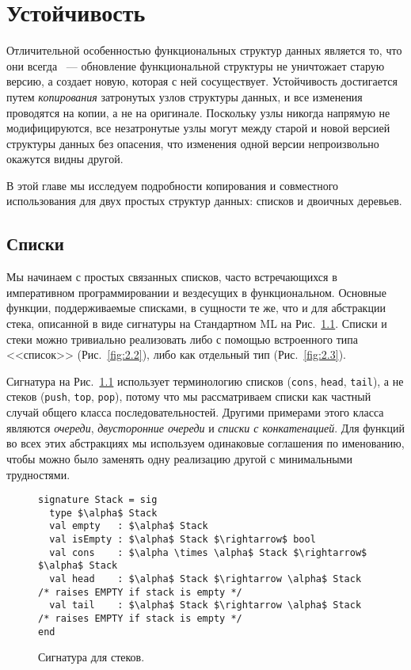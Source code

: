 \chapter{Устойчивость}
\label{ch:2}

Отличительной особенностью функциональных структур данных является то,
что они всегда ~--- обновление
функциональной структуры не уничтожает старую версию, а создает
новую, которая с ней сосуществует. Устойчивость достигается путем
\emph{копирования} затронутых узлов структуры данных, и все изменения
проводятся на копии, а не на оригинале. Поскольку узлы никогда
напрямую не модифицируются, все незатронутые узлы могут
 между старой и новой версией структуры
данных без опасения, что изменения одной версии непроизвольно окажутся
видны другой.

В этой главе мы исследуем подробности копирования и совместного использования для
двух простых структур данных: списков и двоичных деревьев.

\section{Списки}
\label{sc:2.1}

Мы начинаем с простых связанных списков, часто встречающихся в
императивном программировании и вездесущих в функциональном.  Основные
функции, поддерживаемые списками, в сущности те же, что и для
абстракции стека, описанной в виде сигнатуры на Стандартном ML на
Рис.~\ref{fig:2.1}.  Списки и стеки можно тривиально реализовать либо
с помощью встроенного типа <<список>> (Рис.~\ref{fig:2.2}), либо как
отдельный тип (Рис.~\ref{fig:2.3}).

\begin{remark}
Сигнатура на Рис.~\ref{fig:2.1} использует терминологию списков
(\texttt{cons}, \texttt{head}, \texttt{tail}), а не стеков
(\texttt{push}, \texttt{top}, \texttt{pop}), потому что мы
рассматриваем списки как частный случай общего класса
последовательностей. Другими примерами этого класса являются
\emph{очереди}, \emph{двусторонние очереди} и \emph{списки с
  конкатенацией}. Для функций во всех этих абстракциях мы используем
одинаковые соглашения по именованию, чтобы можно было заменять одну
реализацию другой с минимальными трудностями.
\end{remark}

\begin{figure}
\begin{lstlisting}
signature Stack = sig
  type $\alpha$ Stack
  val empty   : $\alpha$ Stack
  val isEmpty : $\alpha$ Stack $\rightarrow$ bool
  val cons    : $\alpha \times \alpha$ Stack $\rightarrow$ $\alpha$ Stack
  val head    : $\alpha$ Stack $\rightarrow \alpha$ Stack /* raises EMPTY if stack is empty */
  val tail    : $\alpha$ Stack $\rightarrow \alpha$ Stack /* raises EMPTY if stack is empty */
end
\end{lstlisting}
  
\caption{Сигнатура для стеков.}  \label{fig:2.1}
\end{figure}


